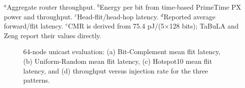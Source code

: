 \documentclass[conference]{IEEEtran}
\begin{document}
\begin{table}[!b]
\caption{Router-Level Comparison With Representative Asynchronous NoC Routers}
\label{tab:router-comparison}
\centering
\scriptsize
\setlength{\tabcolsep}{4.0pt}
\renewcommand{\arraystretch}{1.05}
\vspace{1mm}
\begin{minipage}{0.99\textwidth}
\footnotesize
$^{a}$Aggregate router throughput. $^{b}$Energy per bit from time-based PrimeTime PX power and throughput.
$^{c}$Head-flit/head-hop latency. $^{d}$Reported average forward/flit latency.
$^{e}$CMR is derived from 75.4 pJ/(5$\times$128 bits); TaBuLA and Zeng report their values directly.
\end{minipage}
\end{table}

\setcounter{figure}{7}
\begin{figure}[!b]
\centering

\caption{64-node unicast evaluation: (a) Bit-Complement mean flit latency,
(b) Uniform-Random mean flit latency, (c) Hotspot10 mean flit latency, and
(d) throughput versus injection rate for the three patterns.}
\label{fig:64network}
\end{figure}
\end{document}
